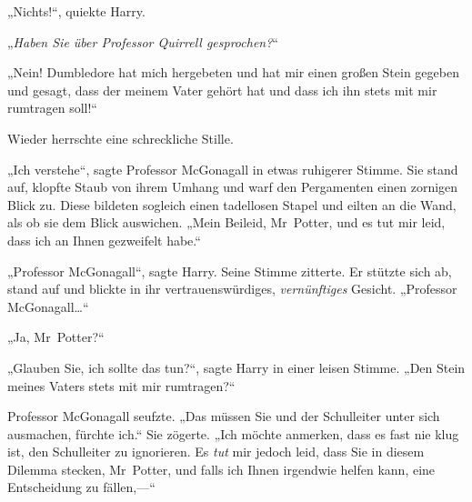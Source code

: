 „Nichts!“, quiekte Harry.

„\emph{Haben Sie über Professor Quirrell gesprochen?}“

„Nein! Dumbledore hat mich hergebeten und hat mir einen großen Stein gegeben und gesagt, dass der meinem Vater gehört hat und dass ich ihn stets mit mir rumtragen soll!“

Wieder herrschte eine schreckliche Stille.

„Ich verstehe“, sagte Professor McGonagall in etwas ruhigerer Stimme. Sie stand auf, klopfte Staub von ihrem Umhang und warf den Pergamenten einen zornigen Blick zu. Diese bildeten sogleich einen tadellosen Stapel und eilten an die Wand, als ob sie dem Blick auswichen. „Mein Beileid, Mr~Potter, und es tut mir leid, dass ich an Ihnen gezweifelt habe.“

„Professor McGonagall“, sagte Harry. Seine Stimme zitterte. Er stützte sich ab, stand auf und blickte in ihr vertrauenswürdiges, \emph{vernünftiges} Gesicht. „Professor McGonagall…“

„Ja, Mr~Potter?“

„Glauben Sie, ich sollte das tun?“, sagte Harry in einer leisen Stimme. „Den Stein meines Vaters stets mit mir rumtragen?“

Professor McGonagall seufzte. „Das müssen Sie und der Schulleiter unter sich ausmachen, fürchte ich.“ Sie zögerte. „Ich möchte anmerken, dass es fast nie klug ist, den Schulleiter zu ignorieren. Es \emph{tut} mir jedoch leid, dass Sie in diesem Dilemma stecken, Mr~Potter, und falls ich Ihnen irgendwie helfen kann, eine Entscheidung zu fällen,—“


